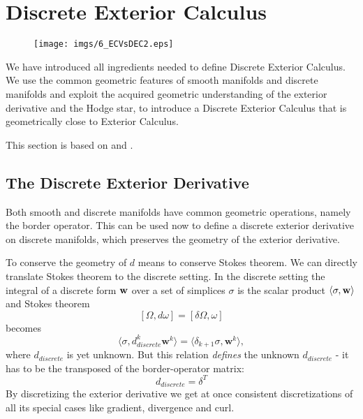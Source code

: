 


\newpage
\section{Discrete Exterior Calculus}
\label{sec:EC_DEC}

\begin{figure}[h]%
\begin{center}
\texttt{[image: imgs/6\_ECVsDEC2.eps]}%
\end{center}
\end{figure}
\noindent  We have introduced all ingredients needed  to define Discrete Exterior Calculus. We use the common geometric features of smooth manifolds and discrete manifolds  and exploit the acquired  geometric understanding of the exterior derivative and the Hodge star, to introduce a Discrete Exterior Calculus that is geometrically close to Exterior Calculus.

This section is based on \cite{hirani03} and \cite{DMK08}.


\subsection{The Discrete Exterior Derivative}
Both smooth and discrete manifolds have common geometric operations, namely the border operator. This can be used now to define a discrete exterior derivative on discrete manifolds, which preserves the geometry of the exterior derivative. 

To conserve the geometry of $d$ means to conserve Stokes theorem.  We can directly translate Stokes theorem to the discrete setting. In the discrete setting the integral of a discrete form $\textbf{w}$ over a set of simplices $\sigma$ is the scalar product $\langle \sigma, \textbf{w} \rangle$ and Stokes theorem
\[[\Omega,d\omega] = [\delta \Omega, \omega]\]
becomes
\[\langle \sigma, d_{discrete}^k\textbf{w}^k \rangle = \langle \delta_{k+1} \sigma, \textbf{w}^k \rangle,\]
where $d_{discrete}$ is yet unknown. But this relation \emph{defines} the unknown $d_{discrete}$ - it has to be the transposed of the border-operator matrix:
\[d_{discrete} = \delta^T\]
By discretizing the exterior derivative we get at once consistent discretizations of all its special cases like gradient, divergence and curl. 

